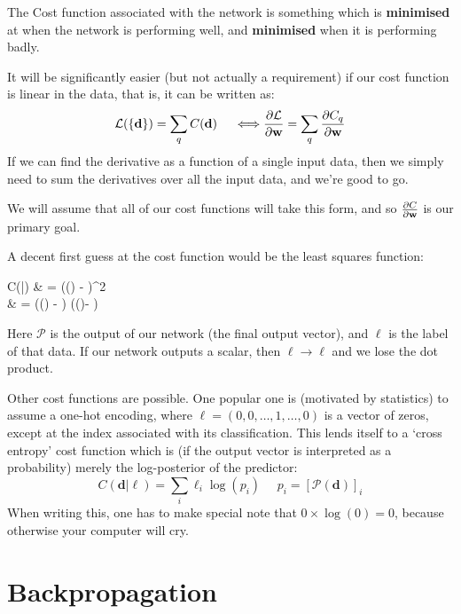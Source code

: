 \documentclass[a4paper,openany,11pt]{book}
\renewcommand\vec[1]{\boldsymbol{\mathbf{#1}}}
\begin{document}
			The Cost function associated with the network is something which is \textbf{minimised} at when the network is performing well, and \textbf{minimised} when it is performing badly. 

			It will be significantly easier (but not actually a requirement) if our cost function is linear in the data, that is, it can be written as:
			\begin{equation}
				\mathcal{L}(\{\vec{d}\}) = \sum_q C(\vec{d}) ~~~~\Longleftrightarrow \pdiv{\mathcal{L}}{\vec{w}} = \sum_q \pdiv{C_q}{\vec{w}}
			\end{equation}
			If we can find the derivative as a function of a single input data, then we simply need to sum the derivatives over all the input data, and we're good to go. 
			
			We will assume that all of our cost functions will take this form, and so $\pdiv{C}{\vec{w}}$ is our primary goal.


			A decent first guess at the cost function would be the least squares function:
			\begin{spalign}
				C(\vec{d}|\vec{\ell}) & = \left((\vec{d}) - \vec{\ell}\right)^2  
				\\
				& = \left((\vec{d}) - \vec{\ell}\right) \cdot \left((\vec{d})- \vec{\ell}\right)
			\end{spalign}
			Here $\mathcal{P}$ is the output of our network (the final output vector), and $\vec{\ell}$ is the label of that data. If our network outputs a scalar, then $\vec{\ell} \to \ell$ and we lose the dot product.

	
			Other cost functions are possible. One popular one is (motivated by statistics) to assume a one-hot encoding, where $\vec{\ell} = (0,0,\hdots,1,\hdots,0)$ is a vector of zeros, except at the index associated with its classification. This lends itself to a `cross entropy' cost function which is (if the output vector is interpreted as a probability) merely the log-posterior of the predictor:
			\begin{equation}
				C(\vec{d}|\vec{\ell}) = \sum_i \ell_i \log(p_i)~~~~~~ p_i = \left[ \mathcal{P}(\vec{d}) \right]_i
			\end{equation} 
			When writing this, one has to make special note that $0 \times \log(0) = 0$, because otherwise your computer will cry.

		\section{Backpropagation}
\end{document}
